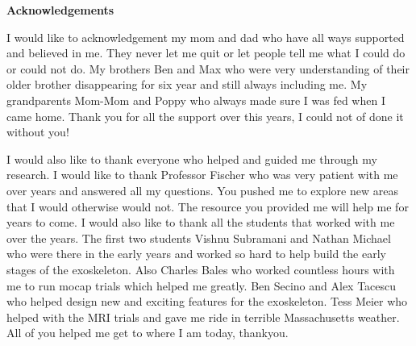 \begin{center}
	\textbf{Acknowledgements}
	 
\end{center}

I would like to acknowledgement my mom and dad who have all ways supported and believed in me. They never let me quit or let people tell me what I could do or could not do. My brothers Ben and Max who were very understanding of their older brother disappearing for six year and still always including me. My grandparents Mom-Mom and Poppy who always made sure I was fed when I came home. Thank you for all the support over this years, I could not of done it without you!

I would also like to thank everyone who helped and guided me through my research. I would like to thank Professor Fischer who was very patient with me over years and answered all my questions. You pushed me to explore new areas that I would otherwise would not. The resource you provided me will help me for years to come. I would also like to thank all the students that worked with me over the years. The first two students Vishnu Subramani and Nathan Michael who were there in the early years and worked so hard to help build the early stages of the exoskeleton. Also Charles Bales who worked countless hours with me to run mocap trials which helped me greatly. Ben Secino and Alex Tacescu who helped design new and exciting features for the exoskeleton. Tess Meier who helped with the MRI trials and gave me ride in terrible Massachusetts weather. All of you helped me get to where I am today, thankyou.  

\clearpage